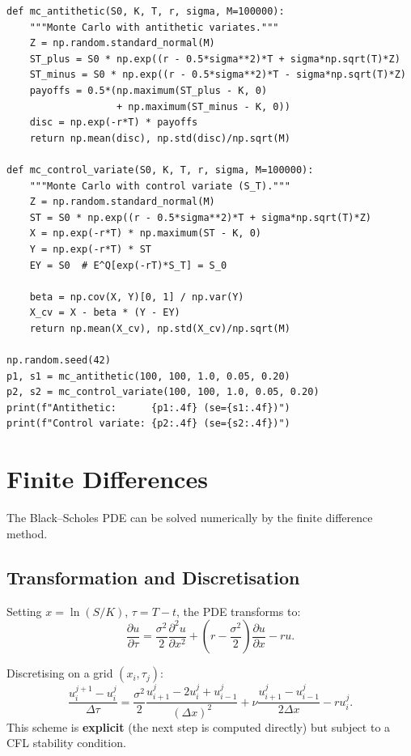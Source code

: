 \begin{codeblock}[title=\textbf{Monte Carlo with Variance Reduction}]
\begin{verbatim}
def mc_antithetic(S0, K, T, r, sigma, M=100000):
    """Monte Carlo with antithetic variates."""
    Z = np.random.standard_normal(M)
    ST_plus = S0 * np.exp((r - 0.5*sigma**2)*T + sigma*np.sqrt(T)*Z)
    ST_minus = S0 * np.exp((r - 0.5*sigma**2)*T - sigma*np.sqrt(T)*Z)
    payoffs = 0.5*(np.maximum(ST_plus - K, 0)
                   + np.maximum(ST_minus - K, 0))
    disc = np.exp(-r*T) * payoffs
    return np.mean(disc), np.std(disc)/np.sqrt(M)

def mc_control_variate(S0, K, T, r, sigma, M=100000):
    """Monte Carlo with control variate (S_T)."""
    Z = np.random.standard_normal(M)
    ST = S0 * np.exp((r - 0.5*sigma**2)*T + sigma*np.sqrt(T)*Z)
    X = np.exp(-r*T) * np.maximum(ST - K, 0)
    Y = np.exp(-r*T) * ST
    EY = S0  # E^Q[exp(-rT)*S_T] = S_0

    beta = np.cov(X, Y)[0, 1] / np.var(Y)
    X_cv = X - beta * (Y - EY)
    return np.mean(X_cv), np.std(X_cv)/np.sqrt(M)

np.random.seed(42)
p1, s1 = mc_antithetic(100, 100, 1.0, 0.05, 0.20)
p2, s2 = mc_control_variate(100, 100, 1.0, 0.05, 0.20)
print(f"Antithetic:      {p1:.4f} (se={s1:.4f})")
print(f"Control variate: {p2:.4f} (se={s2:.4f})")
\end{verbatim}
\end{codeblock}

\section{Finite Differences}

The Black--Scholes PDE can be solved numerically by the finite difference
method.

\subsection{Transformation and Discretisation}

Setting $x = \ln(S/K)$, $\tau = T - t$, the PDE transforms to:
\[
    \frac{\partial u}{\partial\tau} = \frac{\sigma^2}{2}
    \frac{\partial^2 u}{\partial x^2}
    + \left(r - \frac{\sigma^2}{2}\right)\frac{\partial u}{\partial x} - ru.
\]

\begin{definition}
Discretising on a grid $(x_i, \tau_j)$:
\[
    \frac{u_i^{j+1} - u_i^j}{\Delta\tau}
    = \frac{\sigma^2}{2}\frac{u_{i+1}^j - 2u_i^j + u_{i-1}^j}{(\Delta x)^2}
    + \nu\frac{u_{i+1}^j - u_{i-1}^j}{2\Delta x} - ru_i^j.
\]
This scheme is \textbf{explicit} (the next step is computed directly) but
subject to a CFL stability condition.
\end{definition}

